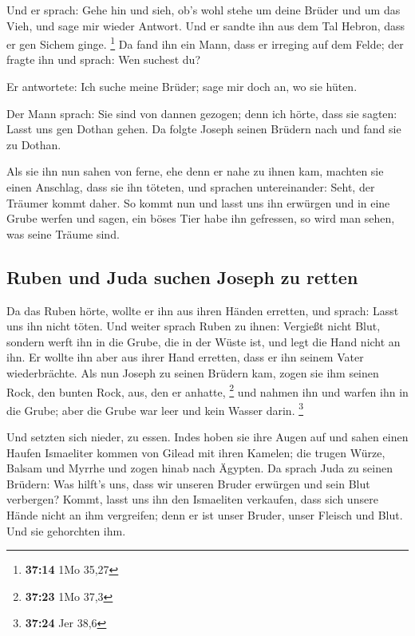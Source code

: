  Und er sprach: Gehe hin und sieh, ob's wohl stehe um
deine Brüder und um das Vieh, und sage mir wieder Antwort. Und er sandte
ihn aus dem Tal Hebron, dass er gen Sichem ginge. \footnote{\textbf{37:14}
  1Mo 35,27}  Da fand ihn ein Mann, dass er irreging auf
dem Felde; der fragte ihn und sprach: Wen suchest du?

 Er antwortete: Ich suche meine Brüder; sage mir doch an,
wo sie hüten.

 Der Mann sprach: Sie sind von dannen gezogen; denn ich
hörte, dass sie sagten: Lasst uns gen Dothan gehen. Da folgte Joseph
seinen Brüdern nach und fand sie zu Dothan.

 Als sie ihn nun sahen von ferne, ehe denn er nahe zu
ihnen kam, machten sie einen Anschlag, dass sie ihn töteten,
 und sprachen untereinander: Seht, der Träumer kommt
daher.  So kommt nun und lasst uns ihn erwürgen und in
eine Grube werfen und sagen, ein böses Tier habe ihn gefressen, so wird
man sehen, was seine Träume sind.

\hypertarget{ruben-und-juda-suchen-joseph-zu-retten}{%
\subsection{Ruben und Juda suchen Joseph zu
retten}\label{ruben-und-juda-suchen-joseph-zu-retten}}

 Da das Ruben hörte, wollte er ihn aus ihren Händen
erretten, und sprach: Lasst uns ihn nicht töten.  Und
weiter sprach Ruben zu ihnen: Vergießt nicht Blut, sondern werft ihn in
die Grube, die in der Wüste ist, und legt die Hand nicht an ihn. Er
wollte ihn aber aus ihrer Hand erretten, dass er ihn seinem Vater
wiederbrächte.  Als nun Joseph zu seinen Brüdern kam,
zogen sie ihm seinen Rock, den bunten Rock, aus, den er anhatte,
\footnote{\textbf{37:23} 1Mo 37,3}  und nahmen ihn und
warfen ihn in die Grube; aber die Grube war leer und kein Wasser darin.
\footnote{\textbf{37:24} Jer 38,6}

 Und setzten sich nieder, zu essen. Indes hoben sie ihre
Augen auf und sahen einen Haufen Ismaeliter kommen von Gilead mit ihren
Kamelen; die trugen Würze, Balsam und Myrrhe und zogen hinab nach
Ägypten.  Da sprach Juda zu seinen Brüdern: Was hilft's
uns, dass wir unseren Bruder erwürgen und sein Blut verbergen?
 Kommt, lasst uns ihn den Ismaeliten verkaufen, dass sich
unsere Hände nicht an ihm vergreifen; denn er ist unser Bruder, unser
Fleisch und Blut. Und sie gehorchten ihm.

